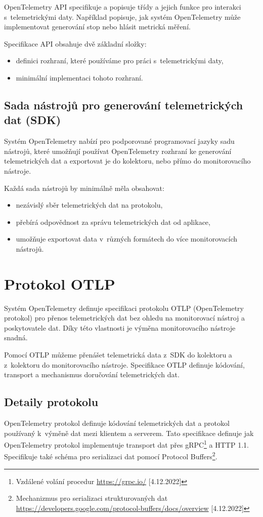OpenTelemetry API specifikuje a popisuje třídy a jejich funkce pro interakci s~telemetrickými daty. Například popisuje, jak systém OpenTelemetry může implementovat generování stop nebo hlásit metrická měření.

Specifikace API obsahuje dvě základní složky:
\begin{itemize}
        \item{definici rozhraní, které používáme pro práci s~telemetrickými daty,}
        \item{minimální implementaci tohoto rozhraní.}
    \end{itemize}

\subsection{Sada nástrojů pro generování telemetrických dat (SDK)}
Systém OpenTelemetry nabízí pro podporované programovací jazyky sadu nástrojů, které umožňují používat OpenTelemetry rozhraní ke generování telemetrických dat a exportovat je do kolektoru, nebo přímo do monitorovacího nástroje.

Každá sada nástrojů by minimálně měla obsahovat:
    \begin{itemize}
        \item{nezávislý sběr telemetrických dat na protokolu,}
        \item{přebírá odpovědnost za správu telemetrických dat od aplikace,}
        \item{umožňuje exportovat data v~různých formátech do více monitorovacích nástrojů.}
    \end{itemize}

\section{Protokol OTLP}
Systém OpenTelemetry definuje specifikaci protokolu OTLP (OpenTelemetry protokol) \cite{OTLP} pro přenos telemetrických dat bez ohledu na monitorovací nástroj a poskytovatele dat. Díky této vlastnosti je výměna monitorovacího nástroje snadná. 

Pomocí OTLP můžeme přenášet telemetrická data z~SDK do kolektoru a z~kolektoru do monitorovacího nástroje. Specifikace OTLP definuje kódování, transport a mechanismus doručování telemetrických dat.

\subsection{Detaily protokolu}
OpenTelemetry protokol definuje kódování telemetrických dat a protokol používaný k~výměně dat mezi klientem a serverem. Tato specifikace definuje jak OpenTelemetry protokol implementuje transport dat přes gRPC\footnote{Vzdálené volání procedur \url{https://grpc.io/} [4.12.2022]} a HTTP 1.1. Specifikuje také schéma pro serializaci dat pomocí Protocol Buffers\footnote{Mechanizmus pro serializaci strukturovaných dat \url{https://developers.google.com/protocol-buffers/docs/overview} [4.12.2022]}.

